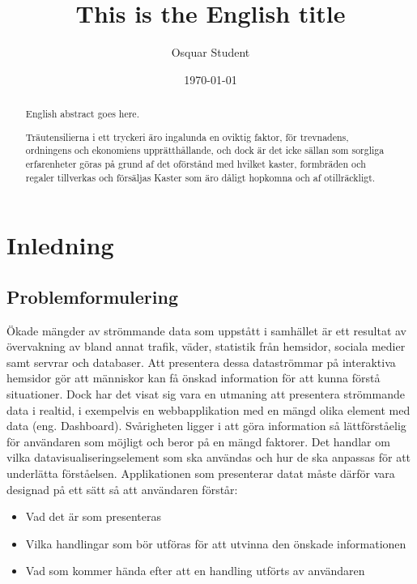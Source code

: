 \documentclass{kththesis}
\title{This is the English title}
\author{Osquar Student}
\date{\today}
\begin{document}
\frontmatter

\titlepage

\begin{abstract}
  English abstract goes here.

  \blindtext
\end{abstract}


\begin{otherlanguage}{swedish}
  \begin{abstract}
    Träutensilierna i ett tryckeri äro ingalunda en oviktig faktor,
    för trevnadens, ordningens och ekonomiens upprätthållande, och
    dock är det icke sällan som sorgliga erfarenheter göras på grund
    af det oförstånd med hvilket kaster, formbräden och regaler
    tillverkas och försäljas Kaster som äro dåligt hopkomna och af
    otillräckligt.
  \end{abstract}
\end{otherlanguage}


\tableofcontents


\mainmatter


\chapter{Inledning}


\section{Problemformulering}

Ökade mängder av strömmande data som uppstått i samhället är ett resultat av övervakning av bland annat trafik, väder, statistik från hemsidor, sociala medier samt servrar och databaser. Att presentera dessa dataströmmar på interaktiva hemsidor gör att människor kan få önskad information för att kunna förstå situationer. Dock har det visat sig vara en utmaning att presentera strömmande data i realtid, i exempelvis en webbapplikation med en mängd olika element med data (eng. Dashboard). Svårigheten ligger i att göra information så lättförståelig för användaren som möjligt och beror på en mängd faktorer. Det handlar om vilka datavisualiseringselement som ska användas och hur de ska anpassas för att underlätta förståelsen. Applikationen som presenterar datat måste därför vara designad på ett sätt så att användaren förstår: 


\begin{itemize}
\item Vad det är som presenteras
\item Vilka handlingar som bör utföras för att 	   utvinna den önskade informationen
\item Vad som kommer hända efter att en handling 		utförts av användaren
\end{itemize}
\end{document}
